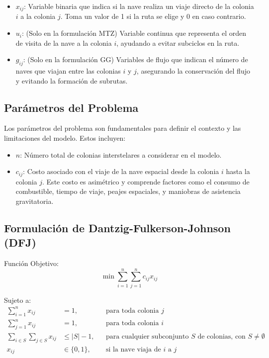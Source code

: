 \documentclass[
	spanish, %
	oneside
]{article}
\begin{document}
\begin{itemize}
    \item \( x_{ij} \): Variable binaria que indica si la nave realiza un viaje directo de la colonia \( i \) a la colonia \( j \). Toma un valor de 1 si la ruta se elige y 0 en caso contrario.
    \item \( u_i \): (Solo en la formulación MTZ) Variable continua que representa el orden de visita de la nave a la colonia \( i \), ayudando a evitar subciclos en la ruta.
    \item \( g_{ij} \): (Solo en la formulación GG) Variables de flujo que indican el número de naves que viajan entre las colonias \( i \) y \( j \), asegurando la conservación del flujo y evitando la formación de subrutas.
\end{itemize}

\subsection*{Parámetros del Problema}

Los parámetros del problema son fundamentales para definir el contexto y las limitaciones del modelo. Estos incluyen:

\begin{itemize}
    \item \( n \): Número total de colonias interstelares a considerar en el modelo.
    \item \( c_{ij} \): Costo asociado con el viaje de la nave espacial desde la colonia \( i \) hasta la colonia \( j \). Este costo es asimétrico y comprende factores como el consumo de combustible, tiempo de viaje, peajes espaciales, y maniobras de asistencia gravitatoria.
\end{itemize}
 \newpage
\subsection*{Formulación de Dantzig-Fulkerson-Johnson (DFJ)}

Función Objetivo:
\begin{equation}
    \min \sum_{i=1}^{n}\sum_{j=1}^{n} c_{ij} x_{ij}
\end{equation}

Sujeto a:
\begin{align}
    \sum_{i=1}^{n} x_{ij} &= 1, && \text{para toda colonia } j \\
    \sum_{j=1}^{n} x_{ij} &= 1, && \text{para toda colonia } i \\
    \sum_{i \in S}\sum_{j \in S} x_{ij} &\leq |S| - 1, && \text{para cualquier subconjunto } S \text{ de colonias, con } S \neq \emptyset \\
    x_{ij} &\in \{0, 1\}, && \text{si la nave viaja de } i \text{ a } j
\end{align}
\end{document}
